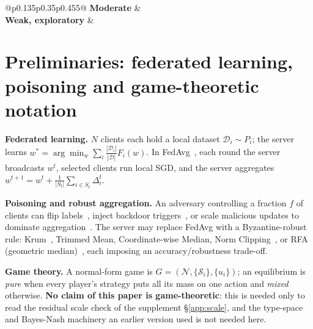 \documentclass{article}
\begin{document}
\begin{table}[h]
\begin{tabular}{@{}p{0.135\linewidth}p{0.35\linewidth}p{0.455\linewidth}@{}}
\addlinespace
\textbf{Moderate} &  \\
\addlinespace
\textbf{Weak, exploratory} &  \\
\bottomrule
\end{tabular}
\end{table}

\section{Preliminaries: federated learning, poisoning and game-theoretic notation}
\label{sec:prelim}
\label{app:framework}

\textbf{Federated learning.} $N$ clients each hold a local dataset $\mathcal{D}_i \sim P_i$; the server learns $w^* = \arg\min_w \sum_i \frac{|\mathcal{D}_i|}{|\mathcal{D}|} F_i(w)$. In FedAvg~\citep{mcmahan2017communication}, each round the server broadcasts $w^t$, selected clients run local SGD, and the server aggregates $w^{t+1} = w^t + \frac{1}{|S_t|}\sum_{i \in S_t} \Delta_i^t$.

\textbf{Poisoning and robust aggregation.} An adversary controlling a fraction $f$ of clients can flip labels~\citep{chen2017targeted}, inject backdoor triggers~\citep{bagdasaryan2020backdoor,xie2019dba}, or scale malicious updates to dominate aggregation~\citep{bagdasaryan2020backdoor}. The server may replace FedAvg with a Byzantine-robust rule: Krum~\citep{blanchard2017machine}, Trimmed Mean, Coordinate-wise Median, Norm Clipping~\citep{sun2019can}, or RFA (geometric median)~\citep{pillutla2022robust}, each imposing an accuracy/robustness trade-off.

\textbf{Game theory.} A normal-form game is $G = (\mathcal{N}, \{\mathcal{S}_i\}, \{u_i\})$; an equilibrium is \emph{pure} when every player's strategy puts all its mass on one action and \emph{mixed} otherwise. \textbf{No claim of this paper is game-theoretic}: this is needed only to read the residual scale check of the supplement §\ref{app:scale}, and the type-space and Bayes-Nash machinery an earlier version used is not needed here.
\end{document}
